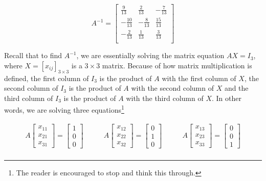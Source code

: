 \documentclass{ximera}
\begin{document}
\[ A^{-1} = \left[ \begin{array}{rrr} \frac{9}{13} & \frac{2}{13} & -\frac{7}{13} \\  -\frac{10}{13} & -\frac{8}{13} & \frac{15}{13} \\  -\frac{2}{13} & \frac{1}{13} & \frac{3}{13} \\ \end{array} \right]\]

Recall that to find $A^{-1}$,  we are essentially solving the matrix equation $AX = I_3$, where $X = \left[ x_{ij} \right]_{3 \times 3}$ is a $3 \times 3$ matrix.  Because of how matrix multiplication is defined, the first column of $I_3$ is the product of $A$ with the first column of $X$, the second column of $I_3$ is the product of $A$ with the second column of $X$ and the third column of $I_3$ is the product of $A$ with the third column of $X$.  In other words, we are solving three equations\footnote{The reader is encouraged to stop and think this through.}

\[\begin{array}{ccc}

A\left[ \begin{array}{r} x_{11} \\ x_{21} \\ x_{31} \end{array} \right] = \left[ \begin{array}{r} 1 \\ 0 \\ 0 \end{array} \right]

&
\qquad
A\left[ \begin{array}{r} x_{12} \\ x_{22} \\ x_{32} \end{array} \right] = \left[ \begin{array}{r} 0 \\ 1 \\ 0 \end{array} \right] 

& 

\qquad

A\left[ \begin{array}{r} x_{13} \\ x_{23} \\ x_{33} \end{array} \right] = \left[ \begin{array}{r} 0 \\ 0 \\ 1 \end{array} \right] \\

\end{array}\]
\end{document}
